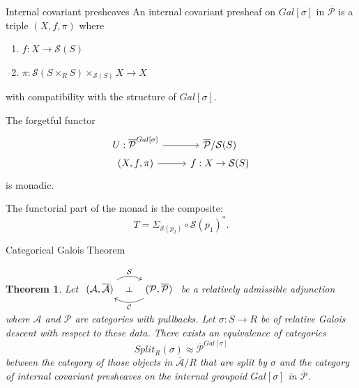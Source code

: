 \documentclass[4pt]{beamer}
\newtheorem{teo}{Theorem}[section]
\begin{document}
\begin{frame}{Internal covariant presheaves}
    An internal covariant presheaf on $Gal[\sigma]$ in $\overline{\mathcal{P}}$ is a triple $(X,f,\pi)$ where
    
    \vspace{1mm}
    
    \begin{enumerate}
        \item $f:X\longrightarrow \mathcal{S}(S)$
        \item $\pi:\mathcal{S}(S\times_RS)\times_{\mathcal{S}(S)}X\longrightarrow X$
    \end{enumerate}
    with compatibility with the structure of $Gal[\sigma]$.

    \vspace{3mm}
    
    The forgetful functor
    \[
    \begin{tikzcd}[every label/.append style = {font = \small}, ampersand replacement=\&, row sep=1pt]
        U:\overline{\mathcal{P}}^{Gal[\sigma]} \arrow[r] \& \overline{\mathcal{P}}/\mathcal{S}(S) \\
        (X,f,\pi) \arrow[r] \& f:X\to \mathcal{S}(S)
    \end{tikzcd}\]
    is monadic. 

    \vspace{1mm}

    The functorial part of the monad is the composite:
    \[ T=\Sigma_{\mathcal{S}(p_2)}\circ{\mathcal{S}(p_1)}^*. \]
\end{frame}

\begin{frame}{Categorical Galois Theorem}
    \begin{teo}
        Let
        $\begin{tikzcd}[ampersand replacement=\&]
            (\mathcal{A},\overline{\mathcal{A}}) \arrow[r, bend left, "\mathcal{S}", ""{name=S}] \& (\mathcal{P},\overline{\mathcal{P}}) \arrow[l, bend left, "\mathcal{C}", ""{name=C}] \arrow[phantom, from=S, to=C, "\dashv" rotate=-90]
        \end{tikzcd}$
        be a relatively admissible adjunction where $\mathcal{A}$ and $\mathcal{P}$ are categories with pullbacks. Let $\sigma:S\to R$ be of relative Galois descent with respect to these data. There exists an equivalence of categories
        \[ Split_R(\sigma)\approx\overline{\mathcal{P}}^{Gal[\sigma]} \]
        between the category of those objects in $\overline{\mathcal{A}}/R$ that are split by $\sigma$ and the category of internal covariant presheaves on the internal groupoid $Gal[\sigma]$ in $\overline{\mathcal{P}}$.
    \end{teo}
\end{frame}
\end{document}
